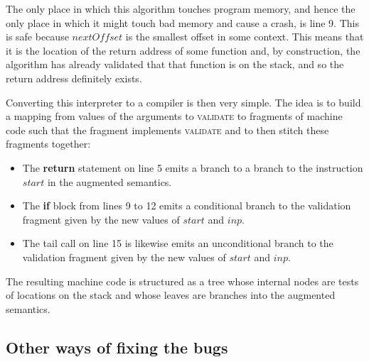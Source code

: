 The only place in which this algorithm touches program memory, and
hence the only place in which it might touch bad memory and cause a
crash, is line 9.  This is safe because $nextOffset$ is the smallest
offset in some context.  This means that it is the location of the
return address of some function and, by construction, the algorithm
has already validated that that function is on the stack, and so the
return address definitely exists.

Converting this interpreter to a compiler is then very simple.  The
idea is to build a mapping from values of the arguments to
\textsc{validate} to fragments of machine code such that the fragment
implements \textsc{validate} and to then stitch these fragments
together:

\begin{itemize}
\item The \textbf{return} statement on line 5 emits a branch to a
  branch to the instruction $start$ in the augmented semantics.
\item The \textbf{if} block from lines 9 to 12 emits a conditional
  branch to the validation fragment given by the new values of $start$
  and $inp$.
\item The tail call on line 15 is likewise emits an unconditional
  branch to the validation fragment given by the new values of $start$
  and $inp$.
\end{itemize}

The resulting machine code is structured as a tree whose internal
nodes are tests of locations on the stack and whose leaves are
branches into the augmented semantics.


\subsection{Other ways of fixing the bugs}




